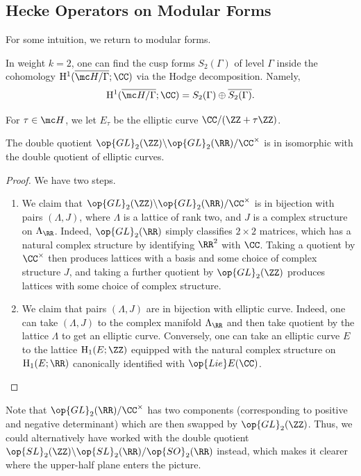 \documentclass[../notes.tex]{subfiles}
\begin{document}
\subsection{Hecke Operators on Modular Forms}
For some intuition, we return to modular forms.
\begin{remark}
	In weight $k=2$, one can find the cusp forms $S_2(\Gamma)$ of level $\Gamma$ inside the cohomology $\mathrm H^1(\overline{\mc H/\Gamma};\CC)$ via the Hodge decomposition. Namely,
	\[\mathrm H^1(\overline{\mc H/\Gamma};\CC)=S_2(\Gamma)\oplus\overline{S_2(\Gamma)}.\]
\end{remark}
\begin{notation}
	For $\tau\in\mc H$, we let $E_\tau$ be the elliptic curve $\CC/(\ZZ+\tau\ZZ)$.
\end{notation}
\begin{lemma}
	The double quotient $\op{GL}_2(\ZZ)\backslash\op{GL}_2(\RR)/\CC^\times$ is in isomorphic with the double quotient of elliptic curves.
\end{lemma}
\begin{proof}
	We have two steps.
	\begin{enumerate}
		\item We claim that $\op{GL}_2(\ZZ)\backslash\op{GL}_2(\RR)/\CC^\times$ is in bijection with pairs $(\Lambda,J)$, where $\Lambda$ is a lattice of rank two, and $J$ is a complex structure on $\Lambda_\RR$. Indeed, $\op{GL}_2(\RR)$ simply classifies $2\times2$ matrices, which has a natural complex structure by identifying $\RR^2$ with $\CC$. Taking a quotient by $\CC^\times$ then produces lattices with a basis and some choice of complex structure $J$, and taking a further quotient by $\op{GL}_2(\ZZ)$  produces lattices with some choice of complex structure.
		\item We claim that pairs $(\Lambda,J)$ are in bijection with elliptic curve. Indeed, one can take $(\Lambda,J)$ to the complex manifold $\Lambda_\RR$ and then take quotient by the lattice $\Lambda$ to get an elliptic curve. Conversely, one can take an elliptic curve $E$ to the lattice $\mathrm H_1(E;\ZZ)$ equipped with the natural complex structure on $\mathrm H_1(E;\RR)$ canonically identified with $\op{Lie}E(\CC)$.
		\qedhere
	\end{enumerate}
\end{proof}
\begin{remark}
	Note that $\op{GL}_2(\RR)/\CC^\times$ has two components (corresponding to positive and negative determinant) which are then swapped by $\op{GL}_2(\ZZ)$. Thus, we could alternatively have worked with the double quotient $\op{SL}_2(\ZZ)\backslash\op{SL}_2(\RR)/\op{SO}_2(\RR)$ instead, which makes it clearer where the upper-half plane enters the picture.
\end{remark}
\end{document}
